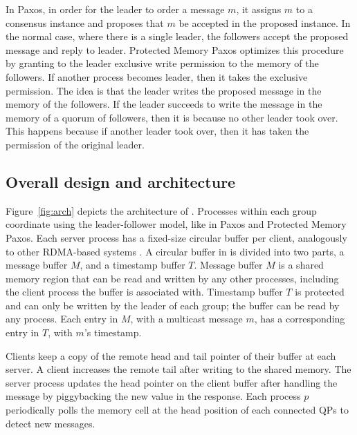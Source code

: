 
In Paxos, in order for the leader to order a message $m$, it assigns $m$ to a consensus instance and proposes that $m$ be accepted in the proposed instance.
In the normal case, where there is a single leader, the followers accept the proposed message and reply to leader.
Protected Memory Paxos optimizes this procedure by granting to the leader exclusive write permission to the memory of the followers.
If another process becomes leader, then it takes the exclusive permission.
The idea is that the leader writes the proposed message in the memory of the followers.
If the leader succeeds to write the message in the memory of a quorum of followers, then it is because no other leader took over.
This happens because if another leader took over, then it has taken the permission of the original leader.

\subsection{Overall design and architecture}

Figure~\ref{fig:arch} depicts the architecture of \libname.
Processes within each group coordinate using the leader-follower model, like in Paxos and Protected Memory Paxos.
Each server process has a fixed-size circular buffer per client, analogously to other RDMA-based systems \cite{FaRM, Mu, DARE, APUS}.
A circular buffer in \libname is divided into two parts, a message buffer $M$, and a timestamp buffer $T$.
Message buffer $M$ is a shared memory region that can be read and written by any other processes, including the client process the buffer is associated with.
Timestamp buffer $T$ is protected and can only be written by the leader of each group; the buffer can be read by any process.
Each entry in $M$, with a multicast message $m$, has a corresponding entry in $T$, with $m$'s timestamp.


Clients keep a copy of the remote head and tail pointer of their buffer at each server. 
A client increases the remote tail after writing to the shared memory. 
The server process updates the head pointer on the client buffer after handling the message by piggybacking the new value in the response.
Each process $p$ periodically polls the memory cell at the head position of each
connected QPs to detect new messages.




